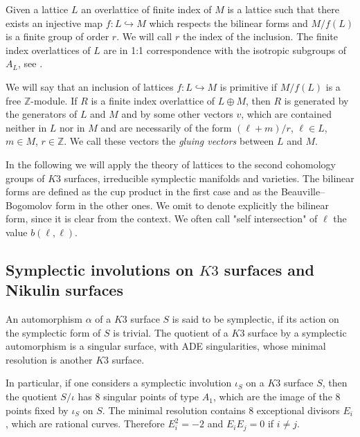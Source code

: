 \documentclass{amsart}
\theoremstyle{definition}
\numberwithin{equation}{section}
\numberwithin{equation}{section} \theoremstyle{definition}
\newcommand\Z{\mathbb{Z}}
\begin{document}
Given a lattice $L$ an overlattice of finite index of $M$ is a lattice such that there exists an injective map $f:L\hookrightarrow M$ which respects the bilinear forms and $M/f(L)$ is a finite group of order $r$. We will call $r$ the index of the inclusion. The finite index overlattices of $L$ are in 1:1 correspondence with the isotropic subgroups of $A_L$, see \cite{N}.

We will say that an inclusion of lattices $f:L\hookrightarrow M$ is primitive if $M/f(L)$ is a free $\Z$-module.
{If $R$ is a finite index overlattice of $L\oplus M$, then $R$ is generated by the generators of $L$ and $M$ and by some other vectors $v$, which are contained neither in $L$ nor in $M$ and are necessarily of the form $(\ell+m)/r$, $\ell\in L$, $m\in M$, $r\in \Z$. We call these vectors the \emph{gluing vectors} between $L$ and $M$.}

In the following we will apply the theory of lattices to the second cohomology groups of $K3$ surfaces, irreducible symplectic manifolds and varieties. The bilinear forms are defined as the cup product in the first case and as the Beauville--Bogomolov form in the other ones. We omit to denote explicitly the bilinear form, since it is clear from the context. We often call "self intersection" of $\ell$ the value $b(\ell,\ell)$.

\subsection{Symplectic involutions on $K3$ surfaces and Nikulin surfaces}\label{subsec: symplectic involution on K3s and Nikuli surfaces}
An automorphism $\alpha$ of a $K3$ surface $S$ is said to be symplectic, if its action on the symplectic form of $S$ is trivial. The quotient of a $K3$ surface by a symplectic automorphism is a singular surface, with ADE singularities, whose minimal resolution is another $K3$ surface.

In particular, if one considers a symplectic involution $\iota_S$ on a $K3$ surface $S$, then the quotient $S/\iota$ has 8 singular points of type $A_1$, which are the image of the 8 points fixed by $\iota_S$ on $S$. The minimal resolution contains 8 exceptional divisors $E_i$, which are rational curves. Therefore $E_i^2=-2$ and $E_iE_j=0$ if $i\neq j$.
\end{document}
